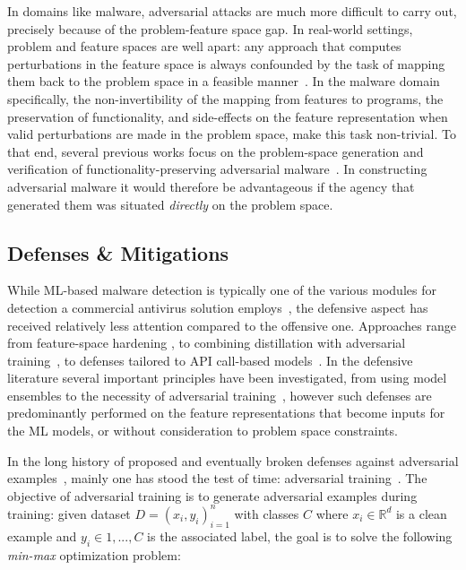 In domains like malware, adversarial attacks are much more difficult to carry out, precisely because of the problem-feature space gap.
In real-world settings, problem and feature spaces are well apart: any approach that computes perturbations in the feature space is always confounded by the task of mapping them back to the problem space in a feasible manner~\cite{sheatsley2020adversarial}.
In the malware domain specifically, the non-invertibility of the mapping from features to programs, the preservation of functionality, and side-effects on the feature representation when valid perturbations are made in the problem space, make this task non-trivial.
To that end, several previous works focus on the problem-space generation and verification of functionality-preserving adversarial malware~\cite{demetrio2021adversarial, demetrio2021functionality, labaca2021aimed}.
In constructing adversarial malware it would therefore be advantageous if the agency that generated them was situated \textit{directly} on the problem space. 

\subsection{Defenses \& Mitigations}
While ML-based malware detection is typically one of the various modules for detection a commercial antivirus solution employs~\cite{botacin2022antiviruses}, the defensive aspect has received relatively less attention compared to the offensive one.
Approaches range from feature-space hardening \cite{galovic2021improving}, to combining distillation with adversarial training~\cite{rathore2021robust}, to defenses tailored to API call-based models~\cite{rosenberg2021sequence}.
In the defensive literature several important principles have been investigated, from using model ensembles to the necessity of adversarial training~\cite{li2021framework}, however such defenses are predominantly performed on the feature representations that become inputs for the ML models, or without consideration to problem space constraints.

In the long history of proposed and eventually broken defenses against adversarial examples~\cite{tramer2020adaptive}, mainly one has stood the test of time: adversarial training~\cite{madry2017towards}.
The objective of adversarial training is to generate adversarial examples during training: given dataset $D = {(x_i, y_i)}^{n}_{i=1}$ with classes $C$ where $x_i \in \mathbb{R}^d$ is a clean example and $y_i \in {1,..., C}$ is the associated label, the goal is to solve the following \emph{min-max} optimization problem:

